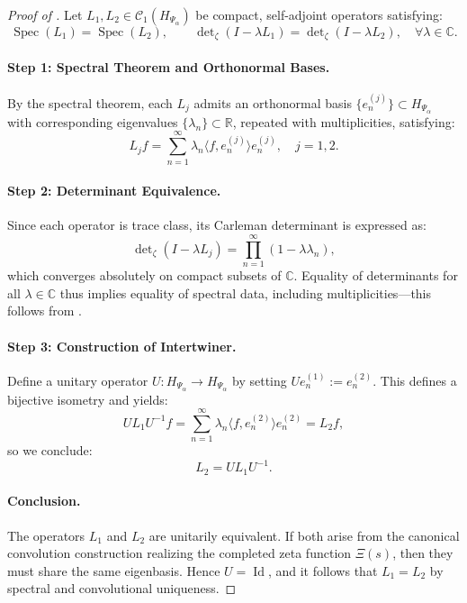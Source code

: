 \begin{proof}[Proof of ]
Let \( L_1, L_2 \in \mathcal{C}_1(H_{\Psi_\alpha}) \) be compact, self-adjoint operators satisfying:
\[
\operatorname{Spec}(L_1) = \operatorname{Spec}(L_2), \qquad
\det\nolimits_\zeta(I - \lambda L_1) = \det\nolimits_\zeta(I - \lambda L_2), \quad \forall \lambda \in \mathbb{C}.
\]

\paragraph{Step 1: Spectral Theorem and Orthonormal Bases.}
By the spectral theorem, each \( L_j \) admits an orthonormal basis \( \{e_n^{(j)}\} \subset H_{\Psi_\alpha} \) with corresponding eigenvalues \( \{\lambda_n\} \subset \mathbb{R} \), repeated with multiplicities, satisfying:
\[
L_j f = \sum_{n=1}^\infty \lambda_n \langle f, e_n^{(j)} \rangle e_n^{(j)}, \quad j = 1,2.
\]

\paragraph{Step 2: Determinant Equivalence.}
Since each operator is trace class, its Carleman determinant is expressed as:
\[
\det\nolimits_\zeta(I - \lambda L_j) = \prod_{n=1}^\infty (1 - \lambda \lambda_n),
\]
which converges absolutely on compact subsets of \( \mathbb{C} \). Equality of determinants for all \( \lambda \in \mathbb{C} \) thus implies equality of spectral data, including multiplicities—this follows from .

\paragraph{Step 3: Construction of Intertwiner.}
Define a unitary operator \( U \colon H_{\Psi_\alpha} \to H_{\Psi_\alpha} \) by setting \( U e_n^{(1)} := e_n^{(2)} \). This defines a bijective isometry and yields:
\[
U L_1 U^{-1} f = \sum_{n=1}^\infty \lambda_n \langle f, e_n^{(2)} \rangle e_n^{(2)} = L_2 f,
\]
so we conclude:
\[
L_2 = U L_1 U^{-1}.
\]

\paragraph{Conclusion.}
The operators \( L_1 \) and \( L_2 \) are unitarily equivalent. If both arise from the canonical convolution construction realizing the completed zeta function \( \Xi(s) \), then they must share the same eigenbasis. Hence \( U = \operatorname{Id} \), and it follows that \( L_1 = L_2 \) by spectral and convolutional uniqueness.
\end{proof}
